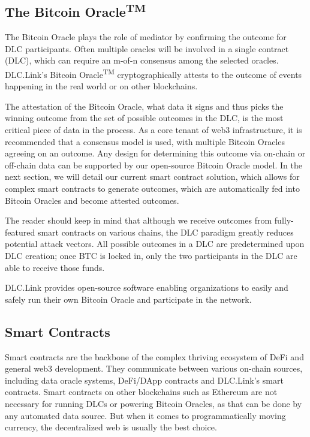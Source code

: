 \documentclass[twoside, a4paper, 11pt]{article}
\begin{document}
  \subsection{The Bitcoin Oracle\textsuperscript{TM}}

  The Bitcoin Oracle plays the role of mediator by confirming the outcome for DLC participants. Often multiple oracles will be involved in a single contract (DLC), which can require an m-of-n consensus among the selected oracles. DLC.Link’s Bitcoin Oracle\textsuperscript{TM} cryptographically attests to the outcome of events happening in the real world or on other blockchains.

  The attestation of the Bitcoin Oracle, what data it signs and thus picks the winning outcome from the set of possible outcomes in the DLC, is the most critical piece of data in the process. As a core tenant of web3 infrastructure, it is recommended that a consensus model is used, with multiple Bitcoin Oracles agreeing on an outcome. Any design for determining this outcome via on-chain or off-chain data can be supported by our open-source Bitcoin Oracle model. In the next section, we will detail our current smart contract solution, which allows for complex smart contracts to generate outcomes, which are automatically fed into Bitcoin Oracles and become attested outcomes.

  The reader should keep in mind that although we receive outcomes from fully-featured smart contracts on various chains, the DLC paradigm greatly reduces potential attack vectors. All possible outcomes in a DLC are predetermined upon DLC creation; once BTC is locked in, only the two participants in the DLC are able to receive those funds.

  DLC.Link provides open-source software enabling organizations to easily and safely run their own Bitcoin Oracle and participate in the network.

  \subsection{Smart Contracts}

  Smart contracts are the backbone of the complex thriving ecosystem of DeFi and general web3 development. They communicate between various on-chain sources, including data oracle systems, DeFi/DApp contracts and DLC.Link’s smart contracts. Smart contracts on other blockchains such as Ethereum are not necessary for running DLCs or powering Bitcoin Oracles, as that can be done by any automated data source. But when it comes to programmatically moving currency, the decentralized web is usually the best choice.
\end{document}
